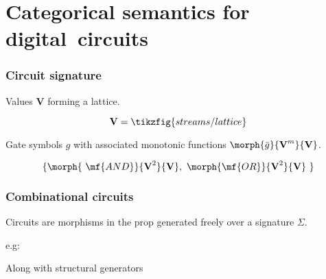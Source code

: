 \section{Categorical semantics for digital~circuits}

\begin{frame}
    \frametitle{Circuit signature}

    \pause

    \alert{Values} \(\textbf{V}\) forming a lattice.

    \pause

    \[\textbf{V} = \tikzfig{streams/lattice}\]

    \pause

    \alert{Gate symbols} \(g\) with associated monotonic functions \(\morph{\bar{g}}{\textbf{V}^m}{\textbf{V}}\).

    \pause

    \[\{\morph{\ \mf{AND}}{\textbf{V}^2}{\textbf{V}},\ \morph{\mf{OR}}{\textbf{V}^2}{\textbf{V}}\ \}\]

\end{frame}

\begin{frame}
    \frametitle{Combinational circuits}

    \pause

    Circuits are \alert{morphisms} in the prop generated freely over a signature \(\Sigma\).

    \pause

    e.g:

    \begin{center}

        \pause

        \vspace{1em}

    \end{center}

    \vspace{1em}

    \pause

    Along with \alert{structural} generators 

    \begin{center}
        \quad
        \quad
    \end{center}

\end{frame}

